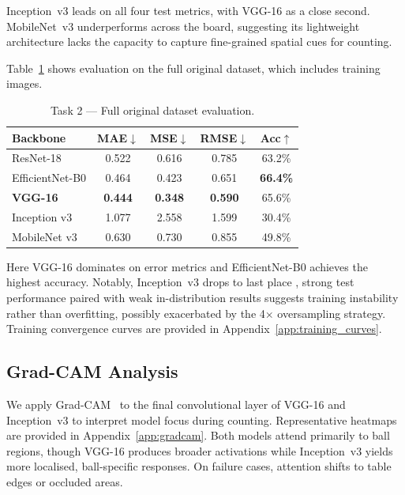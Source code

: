 \documentclass[conference, 10pt]{IEEEtran}
\begin{document}
Inception~v3 leads on all four test metrics, with VGG-16 as a close second.
MobileNet~v3 underperforms across the board, suggesting its lightweight architecture lacks the capacity to capture fine-grained spatial cues for counting.

Table~\ref{tab:task2_full} shows evaluation on the full original dataset, which includes training images.

\begin{table}[h]
\centering
\caption{Task 2 — Full original dataset evaluation.}
\label{tab:task2_full}
\begin{tabular}{lcccc}
\toprule
\textbf{Backbone} & \textbf{MAE}$\downarrow$ & \textbf{MSE}$\downarrow$ & \textbf{RMSE}$\downarrow$ & \textbf{Acc}$\uparrow$ \\
\midrule
ResNet-18             & 0.522 & 0.616 & 0.785 & 63.2\% \\
EfficientNet-B0       & 0.464 & 0.423 & 0.651 & \textbf{66.4\%} \\
\textbf{VGG-16}       & \textbf{0.444} & \textbf{0.348} & \textbf{0.590} & 65.6\% \\
Inception v3          & 1.077 & 2.558 & 1.599 & 30.4\% \\
MobileNet v3          & 0.630 & 0.730 & 0.855 & 49.8\% \\
\bottomrule
\end{tabular}
\end{table}

Here VGG-16 dominates on error metrics and EfficientNet-B0 achieves the highest accuracy.
Notably, Inception~v3 drops to last place , strong test performance paired with weak in-distribution results suggests training instability rather than overfitting, possibly exacerbated by the 4$\times$ oversampling strategy.
Training convergence curves are provided in Appendix~\ref{app:training_curves}.

\subsection{Grad-CAM Analysis}
We apply Grad-CAM~\cite{selvaraju2017gradcam} to the final convolutional layer of VGG-16 and Inception~v3 to interpret model focus during counting.
Representative heatmaps are provided in Appendix~\ref{app:gradcam}.
Both models attend primarily to ball regions, though VGG-16 produces broader activations while Inception~v3 yields more localised, ball-specific responses.
On failure cases, attention shifts to table edges or occluded areas.
\end{document}
